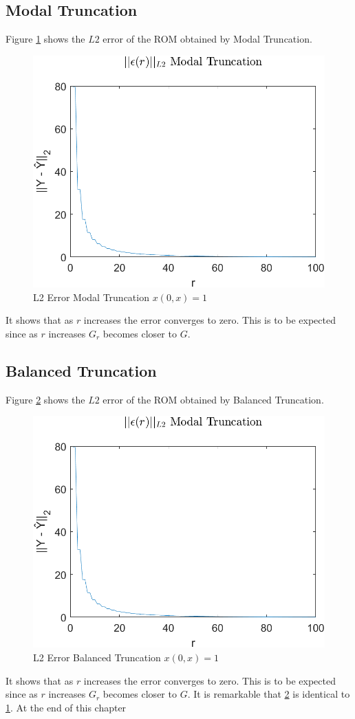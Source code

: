 \subsection{Modal Truncation}
Figure \ref{FIG-ERR-MT} shows the \(L2\) error of the ROM obtained by Modal Truncation.
\begin{figure}[H]
\centering
\includegraphics[width=12.5cm]{images/L2_MT}
\caption{L2 Error Modal Truncation $x(0, x) = 1$}
\label{FIG-ERR-MT}
\end{figure}
It shows that as \(r\) increases the error converges to zero.
This is to be expected since as \(r\) increases \(G_r\) becomes closer to \(G\).

\subsection{Balanced Truncation}
Figure \ref{FIG-ERR-BT} shows the \(L2\) error of the ROM obtained by Balanced Truncation.
\begin{figure}[H]
\centering
\includegraphics[width=12.5cm]{images/L2_MT}
\caption{L2 Error Balanced Truncation $x(0, x) = 1$}
\label{FIG-ERR-BT}
\end{figure}
It shows that as \(r\) increases the error converges to zero.
This is to be expected since as \(r\) increases \(G_r\) becomes closer to \(G\).
It is remarkable that \ref{FIG-ERR-BT} is identical to \ref{FIG-ERR-MT}.
At the end of this chapter

